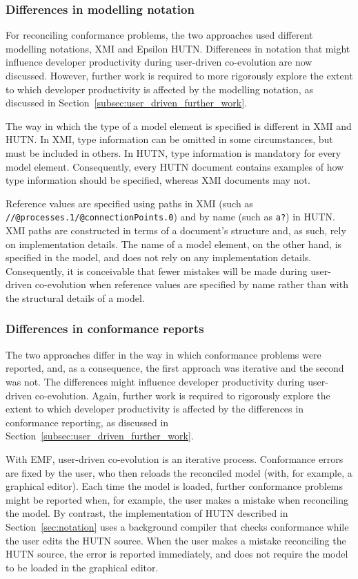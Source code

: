 \subsubsection{Differences in modelling notation}
For reconciling conformance problems, the two approaches used different modelling notations, XMI and Epsilon HUTN. Differences in notation that might influence developer productivity during user-driven co-evolution are now discussed. However, further work is required to more rigorously explore the extent to which developer productivity is affected by the modelling notation, as discussed in Section~\ref{subsec:user_driven_further_work}.

The way in which the type of a model element is specified is different in XMI and HUTN. In XMI, type information can be omitted in some circumstances, but must be included in others. In HUTN, type information is mandatory for every model element. Consequently, every HUTN document contains examples of how type information should be specified, whereas XMI documents may not. 

Reference values are specified using paths in XMI (such as \texttt{//@pro\-ces\-ses.1/@con\-nec\-ti\-onPo\-in\-ts.0}) and by name (such as \texttt{a?}) in HUTN. XMI paths are constructed in terms of a document's structure and, as such, rely on implementation details. The name of a model element, on the other hand, is specified in the model, and does not rely on any implementation details. Consequently, it is conceivable that fewer mistakes will be made during user-driven co-evolution when reference values are specified by name rather than with the structural details of a model.

\subsubsection{Differences in conformance reports}
The two approaches differ in the way in which conformance problems were reported, and, as a consequence, the first approach was iterative and the second was not. The differences might influence developer productivity during user-driven co-evolution. Again, further work is required to rigorously explore the extent to which developer productivity is affected by the differences in conformance reporting, as discussed in Section~\ref{subsec:user_driven_further_work}.

With EMF, user-driven co-evolution is an iterative process. Conformance errors are fixed by the user, who then reloads the reconciled model (with, for example, a graphical editor). Each time the model is loaded, further conformance problems might be reported when, for example, the user makes a mistake when reconciling the model. By contrast, the implementation of HUTN described in Section~\ref{sec:notation} uses a background compiler that checks conformance while the user edits the HUTN source. When the user makes a mistake reconciling the HUTN source, the error is reported immediately, and does not require the model to be loaded in the graphical editor.

